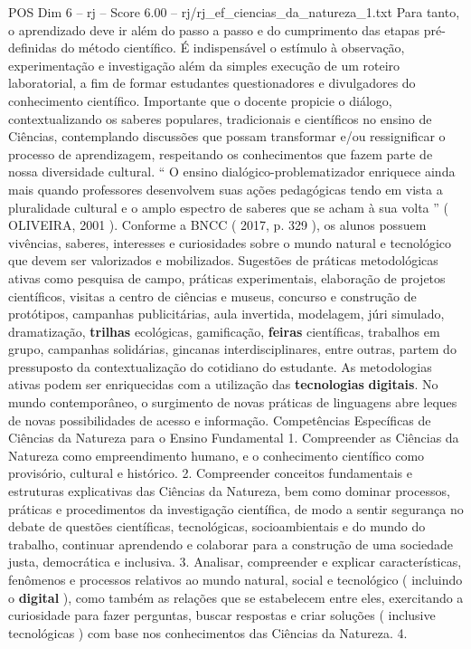 \begin{textsample}{POS Dim 6 – rj – Score 6.00 – rj/rj\_ef\_ciencias\_da\_natureza\_1.txt}
Para tanto, o aprendizado deve ir além do passo a passo e do cumprimento das etapas pré-definidas do método científico.
É indispensável o estímulo à observação, experimentação e investigação além da simples execução de um roteiro laboratorial, a fim de formar estudantes questionadores e divulgadores do conhecimento científico.
Importante que o docente propicie o diálogo, contextualizando os saberes populares, tradicionais e científicos no ensino de Ciências, contemplando discussões que possam transformar e/ou ressignificar o processo de aprendizagem, respeitando os conhecimentos que fazem parte de nossa diversidade cultural. “ O ensino dialógico-problematizador enriquece ainda mais quando professores desenvolvem suas ações pedagógicas tendo em vista a pluralidade cultural e o amplo espectro de saberes que se acham à sua volta ” ( OLIVEIRA, 2001 ).
Conforme a BNCC ( 2017, p. 329 ), os alunos possuem vivências, saberes, interesses e curiosidades sobre o mundo natural e tecnológico que devem ser valorizados e mobilizados.
Sugestões de práticas metodológicas ativas como pesquisa de campo, práticas experimentais, elaboração de projetos científicos, visitas a centro de ciências e museus, concurso e construção de protótipos, campanhas publicitárias, aula invertida, modelagem, júri simulado, dramatização, \textbf{trilhas} ecológicas, gamificação, \textbf{feiras} científicas, trabalhos em grupo, campanhas solidárias, gincanas interdisciplinares, entre outras, partem do pressuposto da contextualização do cotidiano do estudante.
As metodologias ativas podem ser enriquecidas com a utilização das \textbf{tecnologias} \textbf{digitais}.
No mundo contemporâneo, o surgimento de novas práticas de linguagens abre leques de novas possibilidades de acesso e informação.
Competências Específicas de Ciências da Natureza para o Ensino Fundamental 1.
Compreender as Ciências da Natureza como empreendimento humano, e o conhecimento científico como provisório, cultural e histórico. 2.
Compreender conceitos fundamentais e estruturas explicativas das Ciências da Natureza, bem como dominar processos, práticas e procedimentos da investigação científica, de modo a sentir segurança no debate de questões científicas, tecnológicas, socioambientais e do mundo do trabalho, continuar aprendendo e colaborar para a construção de uma sociedade justa, democrática e inclusiva. 3.
Analisar, compreender e explicar características, fenômenos e processos relativos ao mundo natural, social e tecnológico ( incluindo o \textbf{digital} ), como também as relações que se estabelecem entre eles, exercitando a curiosidade para fazer perguntas, buscar respostas e criar soluções ( inclusive tecnológicas ) com base nos conhecimentos das Ciências da Natureza. 4.

\end{textsample}
